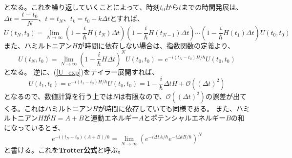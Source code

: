 となる。これを繰り返していくことによって、時刻$t_0$から$t$までの時間発展は、$\Delta t = \dfrac{t-t_0}{N}$、$t = t_N$、$t_k = t_0 + k\Delta t$とすれば、
\begin{equation}
  U(t_N,t_0) = \lim_{N\to \infty} \left(1 - \dfrac{i}{\hbar}H(t_N)\Delta t\right)\left(1 - \dfrac{i}{\hbar}H(t_{N-1})\Delta t\right)\cdots\left(1 - \dfrac{i}{\hbar}H(t_1)\Delta t\right)U(t_0,t_0)
\end{equation}
また、ハミルトニアン$H$が時間に依存しない場合は、指数関数の定義より、
\begin{equation}
    U(t_N,t_0) = \lim_{N\to \infty} \left(1 - \dfrac{i}{\hbar}H \Delta t\right)^N U(t_0,t_0) = e^{-i(t_N - t_0)H/\hbar}U(t_0,t_0)
    \label{U_exp}
\end{equation}
となる。
逆に、(\ref{U_exp})をテイラー展開すれば、
\begin{equation}
  U(t_1,t_0) = e^{-i(t_1 - t_0)H/\hbar}U(t_0,t_0) = 1 - \dfrac{i}{\hbar}\Delta t H + \mathcal{O}((\Delta t)^2)
\end{equation}
となるので、数値計算を行う上では$N$は有限なので、$\mathcal{O}((\Delta t)^2)$の誤差が出てくる。これはハミルトニアン$H$が時間に依存していても同様である。
また、ハミルトニアン$H$が$H=A+B$と運動エネルギー$A$とポテンシャルエネルギー$B$の和になっているとき、
\begin{equation}
  e^{-i(t_N - t_0)(A+B)/\hbar} = \lim_{N\to\infty}\left(e^{-i\Delta t A/\hbar} e^{-i\Delta t B/\hbar}\right)^N
\end{equation}
と書ける。これを{\bf Trotter公式}と呼ぶ。
\begin{comment}
$N$が有限の場合を考えると、
\begin{equation}
  e^{-i(t_N - t_0)(A+B)/\hbar} = \left(e^{-i\Delta t A/\hbar} e^{-i\Delta t B/\hbar}\right)^N + \mathcal{O}\left(\dfrac{(\Delta t)^2}{N}\right)
\end{equation}
\end{comment}

